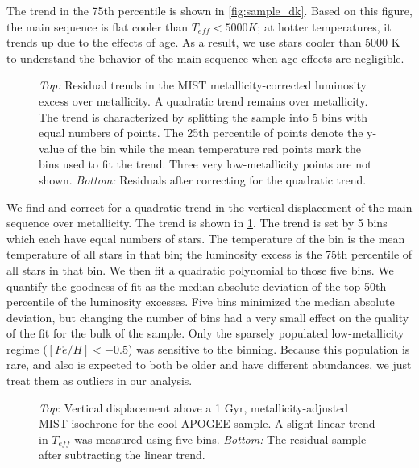 \documentclass[manuscript]{aastex6}
\newcommand{\Teff}{\ensuremath{T_{eff}}}
\begin{document}
The trend in the 75th percentile is shown in \cref{fig:sample_dk}. Based on 
this figure, the main sequence is flat cooler than \(\Teff < 5000 K\); at
hotter temperatures, it trends up due to the effects of age. As a result, we 
use stars cooler than 5000 K to understand the behavior of the main sequence 
when age effects are negligible.

\begin{figure}[htb]
    \centering
    \caption{\emph{Top:} Residual trends in the MIST metallicity-corrected 
        luminosity excess over metallicity. A quadratic trend remains over 
        metallicity. The trend is characterized by splitting the sample into 
        5 bins with equal numbers of points.  The 25th percentile of points 
        denote the y-value of the bin while the mean temperature red points 
        mark the bins used to fit the trend. Three very low-metallicity points
        are not shown. \emph{Bottom:} Residuals after correcting for the 
    quadratic trend.}\label{fig:met_trend}
\end{figure}

We find and correct for a quadratic trend in the vertical displacement of the
main sequence over metallicity. The trend is shown in \cref{fig:met_trend}.
The trend is set by 5 bins which each have equal numbers of stars. The
temperature of the bin is the mean temperature of all stars in that bin; the
luminosity excess is the 75th percentile of all stars in that bin. We then fit
a quadratic polynomial to those five bins. We quantify the goodness-of-fit as
the median absolute deviation of the top 50th percentile of the luminosity
excesses. Five bins minimized the median absolute deviation, but changing the
number of bins had a very small effect on the quality of the fit for the bulk
of the sample. Only the sparsely populated low-metallicity regime (\([Fe/H] <
-0.5\)) was sensitive to the binning. Because this population is rare, and also
is expected to both be older and have different abundances, we just treat them
as outliers in our analysis.

\begin{figure}[htb]
    \centering
    \caption{\emph{Top}: Vertical displacement above a 1 Gyr,
        metallicity-adjusted MIST isochrone for the cool APOGEE sample. A 
        slight linear trend in \Teff{} was measured using five bins. 
        \emph{Bottom:} The residual sample after subtracting the linear 
    trend.}
    \label{fig:apogee_teff_trend}
\end{figure}
\end{document}
